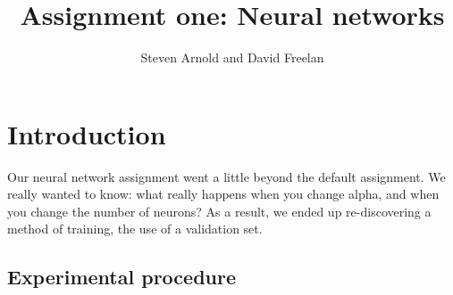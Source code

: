 \documentclass[11pt]{amsart}
\title{Assignment one: Neural networks}
\author{Steven Arnold and David Freelan}
\begin{document}
\maketitle


\section{Introduction}
Our neural network assignment went a little beyond the default assignment. We really wanted to know: what really happens when you change alpha, and when you change the number of neurons? As a result, we ended up re-discovering a method of training, the use of a validation set.


\subsection{Experimental procedure}
\end{document}
